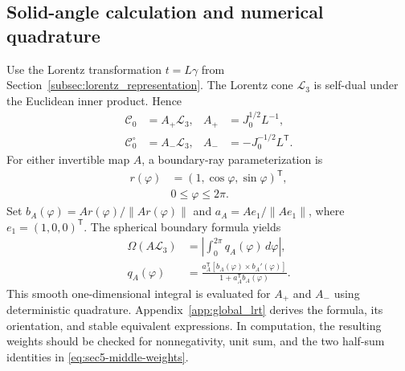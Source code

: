 \subsection{Solid-angle calculation and numerical quadrature}
\label{subsec:global_solid_angle}
Use the Lorentz transformation $t=L\gamma$ from
Section~\ref{subsec:lorentz_representation}. The Lorentz cone
$\mathcal L_3$ is self-dual under the Euclidean inner product. Hence
\begin{equation}\label{eq:sec5-angle-maps}
 \begin{aligned}
 \mathcal C_0&=A_+\mathcal L_3,
 &A_+&=J_0^{1/2}L^{-1},\\
 \mathcal C_0^\circ&=A_-\mathcal L_3,
 &A_-&=-J_0^{-1/2}L^{\mathsf T}.
 \end{aligned}
\end{equation}
For either invertible map $A$, a boundary-ray parameterization is
\begin{equation}\label{eq:sec5-boundary-rays}
 \begin{aligned}
 r(\varphi)&=(1,\cos\varphi,\sin\varphi)^{\mathsf T},\\
 &0\leq\varphi\leq2\pi.
 \end{aligned}
\end{equation}
Set $b_A(\varphi)=Ar(\varphi)/\|Ar(\varphi)\|$ and
$a_A=Ae_1/\|Ae_1\|$, where $e_1=(1,0,0)^{\mathsf T}$.
The spherical boundary formula yields
\begin{equation}\label{eq:sec5-angle-integral}
 \begin{aligned}
 \Omega(A\mathcal L_3)
 &=\left|\int_0^{2\pi}q_A(\varphi)\,d\varphi\right|,\\
 q_A(\varphi)
 &=\frac{a_A^{\mathsf T}
 [b_A(\varphi)\times b_A'(\varphi)]}
 {1+a_A^{\mathsf T}b_A(\varphi)}.
 \end{aligned}
\end{equation}
This smooth one-dimensional integral is evaluated for $A_+$ and
$A_-$ using deterministic quadrature. Appendix~\ref{app:global_lrt} derives the formula,
its orientation, and stable equivalent expressions. In computation,
the resulting weights should be checked for nonnegativity, unit sum,
and the two half-sum identities in
\eqref{eq:sec5-middle-weights}.

